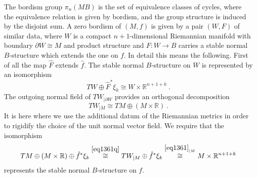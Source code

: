 \documentclass[12pt]{article}
\newcommand{\R}{{\mathbb{R}}}
\begin{document}
% 
 
 



 
The bordism group $\pi_{n}(MB)$ is the set of equivalence classes of cycles, where the equivalence relation is given by bordism, and the group structure is induced by the disjoint sum.
 A zero bordism of $(M,f)$ is given by a pair $(W,F)$ of similar data, where $W$ is a compact $n+1$-dimensional Riemannian manifold with boundary $\partial W\cong M$  and product structure and   $F:W\to B$ carries a stable normal $B$-structure  which extends the one on $f$. 
   In detail this means the following. First of all the map $\hat F$ extends $\hat f$. The   stable normal $B$-structure on $W$ is  represented by an  isomorphism
\begin{equation}\label{eq1361}TW\oplus \hat F^{*}\xi_{k}\cong W\times \R^{n+1+k}\ .\end{equation}  The outgoing normal field of $TW_{|\partial W}$ provides
an orthogonal decomposition
\begin{equation}\label{eq1361q}TW_{|M}\cong TM\oplus (M\times \R)\ . \end{equation} 
It is here where we use the additional datum of the Riemannian metrics in order to rigidify the choice of the unit normal vector field.
We require that the isomorphism 
$$TM\oplus (M\times \R)\oplus \hat f^{*}\xi_{k} \stackrel{\eqref{eq1361q}}{\cong}  TW_{|M}\oplus \hat f^{*}\xi_{k}\stackrel{\eqref{eq1361}_{|M}}{\cong} M\times \R^{n+1+k}$$ represents the stable normal $B$-structure on $f$.
\end{document}
